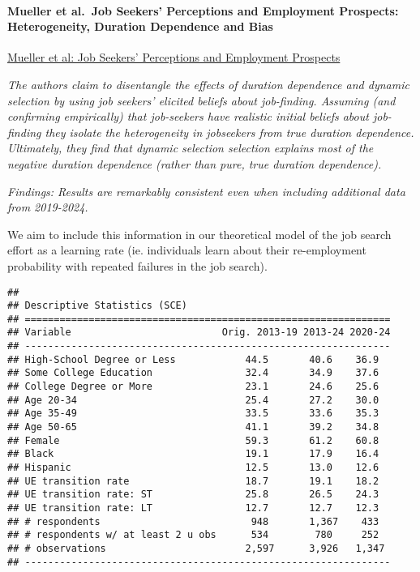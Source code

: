 \paragraph{Mueller et al.~Job Seekers' Perceptions and Employment
Prospects: Heterogeneity, Duration Dependence and
Bias}\label{mueller-et-al.-job-seekers-perceptions-and-employment-prospects-heterogeneity-duration-dependence-and-bias}

\href{https://www.aeaweb.org/articles?id=10.1257/aer.20190808}{Mueller
et al: Job Seekers' Perceptions and Employment Prospects}

\emph{The authors claim to disentangle the effects of duration
dependence and dynamic selection by using job seekers' elicited beliefs
about job-finding. Assuming (and confirming empirically) that
job-seekers have realistic initial beliefs about job-finding they
isolate the heterogeneity in jobseekers from true duration dependence.
Ultimately, they find that dynamic selection selection explains most of
the negative duration dependence (rather than pure, true duration
dependence).}

\emph{Findings: Results are remarkably consistent even when including
additional data from 2019-2024.}

We aim to include this information in our theoretical model of the job
search effort as a learning rate (ie. individuals learn about their
re-employment probability with repeated failures in the job search).

\begin{verbatim}
## 
## Descriptive Statistics (SCE)
## ===============================================================
## Variable                          Orig. 2013-19 2013-24 2020-24
## ---------------------------------------------------------------
## High-School Degree or Less            44.5       40.6    36.9  
## Some College Education                32.4       34.9    37.6  
## College Degree or More                23.1       24.6    25.6  
## Age 20-34                             25.4       27.2    30.0  
## Age 35-49                             33.5       33.6    35.3  
## Age 50-65                             41.1       39.2    34.8  
## Female                                59.3       61.2    60.8  
## Black                                 19.1       17.9    16.4  
## Hispanic                              12.5       13.0    12.6  
## UE transition rate                    18.7       19.1    18.2  
## UE transition rate: ST                25.8       26.5    24.3  
## UE transition rate: LT                12.7       12.7    12.3  
## # respondents                          948       1,367    433  
## # respondents w/ at least 2 u obs      534        780     252  
## # observations                        2,597      3,926   1,347 
## ---------------------------------------------------------------
\end{verbatim}

